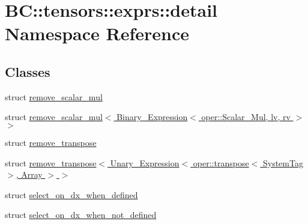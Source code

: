 \hypertarget{namespaceBC_1_1tensors_1_1exprs_1_1detail}{}\section{BC\+:\+:tensors\+:\+:exprs\+:\+:detail Namespace Reference}
\label{namespaceBC_1_1tensors_1_1exprs_1_1detail}
\subsection*{Classes}
\begin{DoxyCompactItemize}
\item 
struct \hyperlink{structBC_1_1tensors_1_1exprs_1_1detail_1_1remove__scalar__mul}{remove\+\_\+scalar\+\_\+mul}
\item 
struct \hyperlink{structBC_1_1tensors_1_1exprs_1_1detail_1_1remove__scalar__mul_3_01Binary__Expression_3_01oper_1_93122bdabcd1e75e50e91d14ca138deb}{remove\+\_\+scalar\+\_\+mul$<$ Binary\+\_\+\+Expression$<$ oper\+::\+Scalar\+\_\+\+Mul, lv, rv $>$ $>$}
\item 
struct \hyperlink{structBC_1_1tensors_1_1exprs_1_1detail_1_1remove__transpose}{remove\+\_\+transpose}
\item 
struct \hyperlink{structBC_1_1tensors_1_1exprs_1_1detail_1_1remove__transpose_3_01Unary__Expression_3_01oper_1_1tr9d22846580f2535ee6f45835f1520436}{remove\+\_\+transpose$<$ Unary\+\_\+\+Expression$<$ oper\+::transpose$<$ System\+Tag $>$, Array $>$ $>$}
\item 
struct \hyperlink{structBC_1_1tensors_1_1exprs_1_1detail_1_1select__on__dx__when__defined}{select\+\_\+on\+\_\+dx\+\_\+when\+\_\+defined}
\item 
struct \hyperlink{structBC_1_1tensors_1_1exprs_1_1detail_1_1select__on__dx__when__not__defined}{select\+\_\+on\+\_\+dx\+\_\+when\+\_\+not\+\_\+defined}
\end{DoxyCompactItemize}
